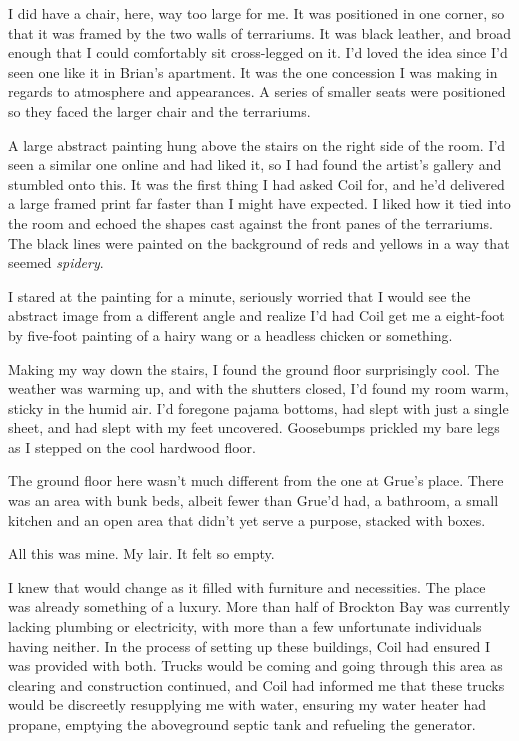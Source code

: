I did have a chair, here, way too large for me.  It was positioned in one corner, so that it was framed by the two walls of terrariums.  It was black leather, and broad enough that I could comfortably sit cross-legged on it.  I'd loved the idea since I'd seen one like it in Brian's apartment.  It was the one concession I was making in regards to atmosphere and appearances.  A series of smaller seats were positioned so they faced the larger chair and the terrariums.



A large abstract painting hung above the stairs on the right side of the room.  I'd seen a similar one online and had liked it, so I had found the artist's gallery and stumbled onto this.  It was the first thing I had asked Coil for, and he'd delivered a large framed print far faster than I might have expected.  I liked how it tied into the room and echoed the shapes cast against the front panes of the terrariums.  The black lines were painted on the background of reds and yellows in a way that seemed \emph{spidery}.



I stared at the painting for a minute, seriously worried that I would see the abstract image from a different angle and realize I'd had Coil get me a eight-foot by five-foot painting of a hairy wang or a headless chicken or something.



Making my way down the stairs, I found the ground floor surprisingly cool.  The weather was warming up, and with the shutters closed, I'd found my room warm, sticky in the humid air.  I'd foregone pajama bottoms, had slept with just a single sheet, and had slept with my feet uncovered.  Goosebumps prickled my bare legs as I stepped on the cool hardwood floor.



The ground floor here wasn't much different from the one at Grue's place.  There was an area with bunk beds, albeit fewer than Grue'd had, a bathroom, a small kitchen and an open area that didn't yet serve a purpose, stacked with boxes.



All this was mine.  My lair.  It felt so empty.



I knew that would change as it filled with furniture and necessities.  The place was already something of a luxury.  More than half of Brockton Bay was currently lacking plumbing or electricity, with more than a few unfortunate individuals having neither.  In the process of setting up these buildings, Coil had ensured I was provided with both.  Trucks would be coming and going through this area as clearing and construction continued, and Coil had informed me that these trucks would be discreetly resupplying me with water, ensuring my water heater had propane, emptying the aboveground septic tank and refueling the generator.



